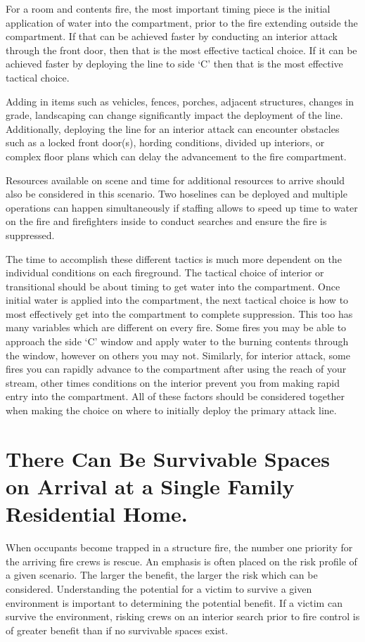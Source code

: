 \documentclass[12pt,oneside]{book}
\begin{document}
For a room and contents fire, the most important timing piece is the initial application of water into the compartment, prior to the fire extending outside the compartment. If that can be achieved faster by conducting an interior attack through the front door, then that is the most effective tactical choice. If it can be achieved faster by deploying the line to side `C' then that is the most effective tactical choice.

Adding in items such as vehicles, fences, porches, adjacent structures, changes in grade, landscaping can change significantly impact the deployment of the line. Additionally, deploying the line for an interior attack can encounter obstacles such as a locked front door(s), hording conditions, divided up interiors, or complex floor plans which can delay the advancement to the fire compartment. 

Resources available on scene and time for additional resources to arrive should also be considered in this scenario. Two hoselines can be deployed and multiple operations can happen simultaneously if staffing allows to speed up time to water on the fire and firefighters inside to conduct searches and ensure the fire is suppressed.

The time to accomplish these different tactics is much more dependent on the individual conditions on each fireground. The tactical choice of interior or transitional should be about timing to get water into the compartment. Once initial water is applied into the compartment, the next tactical choice is how to most effectively get into the compartment to complete suppression. This too has many variables which are different on every fire. Some fires you may be able to approach the side `C' window and apply water to the burning contents through the window, however on others you may not. Similarly, for interior attack, some fires you can rapidly advance to the compartment after using the reach of your stream, other times conditions on the interior prevent you from making rapid entry into the compartment. All of these factors should be considered together when making the choice on where to initially deploy the primary attack line. 

\section{There Can Be Survivable Spaces on Arrival at a Single Family Residential Home.} \label{tc:survivable_spaces}
When occupants become trapped in a structure fire, the number one priority for the arriving fire crews is rescue. An emphasis is often placed on the risk profile of a given scenario. The larger the benefit, the larger the risk which can be considered. Understanding the potential for a victim to survive a given environment is important to determining the potential benefit. If a victim can survive the environment, risking crews on an interior search prior to fire control is of greater benefit than if no survivable spaces exist. 
\end{document}
